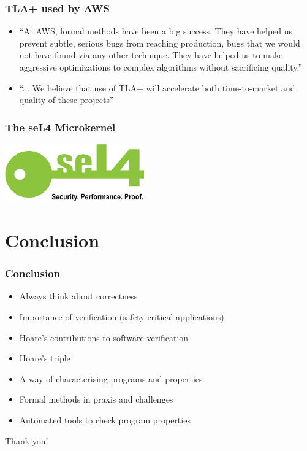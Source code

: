 \documentclass{beamer}
\begin{document}
\begin{frame}
	\frametitle{TLA+ used by AWS}
	\begin{itemize}
\item “At AWS, formal methods have been a big success. They have helped us prevent subtle,
serious bugs from reaching production, bugs that we would not have found via any other
technique. They have helped us to make aggressive optimizations to complex algorithms
without sacrificing quality.”

\item “... We believe that use of TLA+ will accelerate both time-to-market and quality of these
	projects” 
\end{itemize}
\end{frame}	

\begin{frame}
        \frametitle{The seL4 Microkernel}
        \center
	\includegraphics[width = 60mm] {sel4.png}
\end{frame}

\section{Conclusion}
\begin{frame}
	\frametitle{Conclusion}
	\begin{itemize}
		\item Always think about correctness
		\item Importance of verification (safety-critical applications)
		\item Hoare's contributions to software verification 
		\item Hoare's triple
		\item A way of characterising programs and properties
		\item Formal methods in praxis and challenges
		\item Automated tools to check program properties
	\end{itemize}
\end{frame}

\begin{frame}
	\begin{center}
		Thank you!
	\end{center}
\end{frame}
\printbibliography
\end{document}
